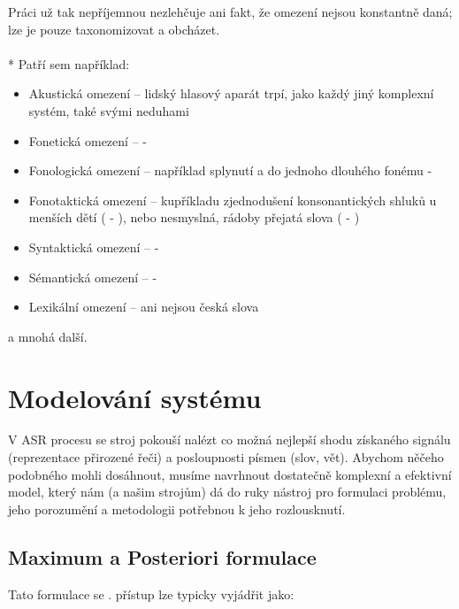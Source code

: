 Práci už tak nepříjemnou nezlehčuje ani fakt, že omezení nejsou konstantně daná; lze je pouze taxonomizovat a obcházet.
\\\\*
Patří sem například:

\begin{itemize}
\item Akustická omezení -- lidský hlasový aparát trpí, jako každý jiný komplexní systém, také svými neduhami
\item Fonetická omezení --  - 
\item Fonologická omezení -- například splynutí  a  do jednoho dlouhého fonému - 
\item Fonotaktická omezení -- kupříkladu zjednodušení konsonantických shluků u menších dětí ( - ), nebo nesmyslná, rádoby přejatá slova ( - )
\item Syntaktická omezení --  - 
\item Sémantická omezení --  - 
\item Lexikální omezení --  ani  nejsou česká slova
\end{itemize}

a mnohá další.

\section{Modelování systému}

V ASR procesu se stroj pokouší nalézt co možná nejlepší shodu získaného signálu (reprezentace přirozené řeči) a posloupnosti písmen (slov, vět). Abychom něčeho podobného mohli dosáhnout, musíme navrhnout dostatečně komplexní a efektivní model, který nám (a našim strojům) dá do ruky nástroj pro formulaci problému, jeho porozumění a metodologii potřebnou k jeho rozlousknutí.

\subsection{Maximum a Posteriori formulace}

Tato formulace se  \cite{jelinek_2010}.  přístup \cite{bahl_jelinek_1983} lze typicky vyjádřit jako:

